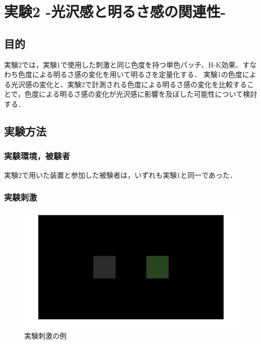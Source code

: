 \chapter{実験2 -光沢感と明るさ感の関連性-}

    \section{目的}

        実験2では，実験1で使用した刺激と同じ色度を持つ単色パッチ、H-K効果、すなわち色度による明るさ感の変化を用いて明るさを定量化する．
        実験1の色度による光沢感の変化と、実験2で計測される色度による明るさ感の変化を比較することで，色度による明るさ感の変化が光沢感に影響を及ぼした可能性について検討する．


    \section{実験方法}
        \subsection{実験環境，被験者}

            実験2で用いた装置と参加した被験者は，いずれも実験1と同一であった．

        \subsection{実験刺激}

            \begin{figure}[h]
                \centering
                \includegraphics[width=14.0cm]{./img/ex2_stimuli2.png}
                \caption{実験刺激の例}
                \label{ex2_stimuli}
            \end{figure}

